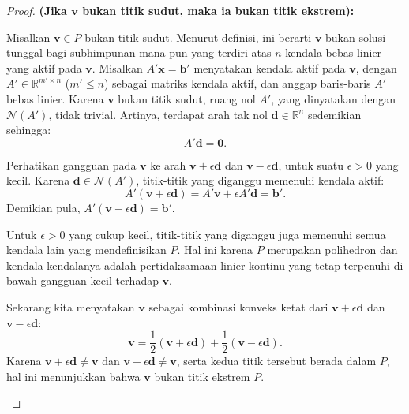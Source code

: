 \begin{proof}
\textbf{(Jika \( \mathbf{v} \) bukan titik sudut, maka ia bukan titik ekstrem):}

Misalkan \( \mathbf{v} \in P \) bukan titik sudut. Menurut definisi, ini berarti \( \mathbf{v} \) bukan solusi tunggal bagi subhimpunan mana pun yang terdiri atas \( n \) kendala bebas linier yang aktif pada \( \mathbf{v} \). Misalkan \( A' \mathbf{x} = \mathbf{b}' \) menyatakan kendala aktif pada \( \mathbf{v} \), dengan \( A' \in \mathbb{R}^{m' \times n} \) (\( m' \leq n \)) sebagai matriks kendala aktif, dan anggap baris-baris \( A' \) bebas linier. Karena \( \mathbf{v} \) bukan titik sudut, ruang nol \( A' \), yang dinyatakan dengan \( \mathcal{N}(A') \), tidak trivial. Artinya, terdapat arah tak nol \( \mathbf{d} \in \mathbb{R}^n \) sedemikian sehingga:
\[
A' \mathbf{d} = \mathbf{0}.
\]

Perhatikan gangguan pada \( \mathbf{v} \) ke arah \( \mathbf{v} + \epsilon \mathbf{d} \) dan \( \mathbf{v} - \epsilon \mathbf{d} \), untuk suatu \( \epsilon > 0 \) yang kecil. Karena \( \mathbf{d} \in \mathcal{N}(A') \), titik-titik yang diganggu memenuhi kendala aktif:
\[
A' (\mathbf{v} + \epsilon \mathbf{d}) = A' \mathbf{v} + \epsilon A' \mathbf{d} = \mathbf{b}'.
\]
Demikian pula, \( A' (\mathbf{v} - \epsilon \mathbf{d}) = \mathbf{b}' \).

Untuk \( \epsilon > 0 \) yang cukup kecil, titik-titik yang diganggu juga memenuhi semua kendala lain yang mendefinisikan \( P \). Hal ini karena \( P \) merupakan polihedron dan kendala-kendalanya adalah pertidaksamaan linier kontinu yang tetap terpenuhi di bawah gangguan kecil terhadap \( \mathbf{v} \).

Sekarang kita menyatakan \( \mathbf{v} \) sebagai kombinasi konveks ketat dari \( \mathbf{v} + \epsilon \mathbf{d} \) dan \( \mathbf{v} - \epsilon \mathbf{d} \):
\[
\mathbf{v} = \frac{1}{2} (\mathbf{v} + \epsilon \mathbf{d}) + \frac{1}{2} (\mathbf{v} - \epsilon \mathbf{d}).
\]
Karena \( \mathbf{v} + \epsilon \mathbf{d} \neq \mathbf{v} \) dan \( \mathbf{v} - \epsilon \mathbf{d} \neq \mathbf{v} \), serta kedua titik tersebut berada dalam \( P \), hal ini menunjukkan bahwa \( \mathbf{v} \) bukan titik ekstrem \( P \).

\begin{center}
\end{center}
\end{proof}
